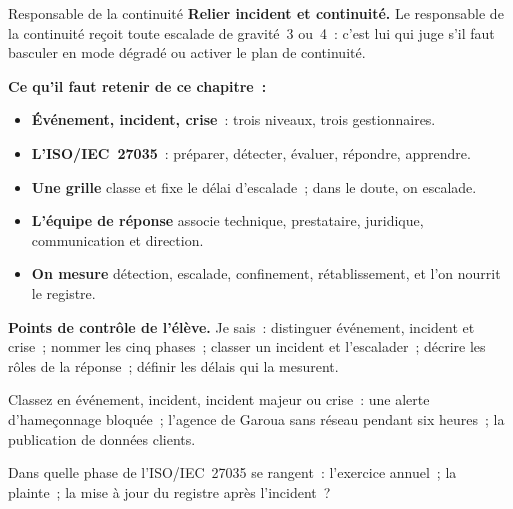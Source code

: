 \begin{boxmetier}{Responsable de la continuité}
\textbf{Relier incident et continuité.} Le responsable de la continuité
reçoit toute escalade de gravité~3 ou~4~: c'est lui qui juge s'il faut
basculer en mode dégradé ou activer le plan de continuité.
\end{boxmetier}

\separateur

\begin{boxresume}
\textbf{Ce qu'il faut retenir de ce chapitre~:}
\begin{itemize}
    \item \textbf{Événement, incident, crise}~: trois niveaux, trois
          gestionnaires.
    \item \textbf{L'ISO/IEC~27035}~: préparer, détecter, évaluer, répondre,
          apprendre.
    \item \textbf{Une grille} classe et fixe le délai d'escalade~; dans le
          doute, on escalade.
    \item \textbf{L'équipe de réponse} associe technique, prestataire,
          juridique, communication et direction.
    \item \textbf{On mesure} détection, escalade, confinement,
          rétablissement, et l'on nourrit le registre.
\end{itemize}
\end{boxresume}

\begin{boxinfo}
\textbf{Points de contrôle de l'élève.} Je sais~: distinguer événement,
incident et crise~; nommer les cinq phases~; classer un incident et
l'escalader~; décrire les rôles de la réponse~; définir les délais qui la
mesurent.
\end{boxinfo}

\bigskip

\begin{boxexo}[title={\ding{45}\quad Exercice~16.1. Quel niveau~? \niveaubase}]
Classez en événement, incident, incident majeur ou crise~: une alerte
d'hameçonnage bloquée~; l'agence de Garoua sans réseau pendant six
heures~; la publication de données clients.
\end{boxexo}

\begin{boxexo}[title={\ding{45}\quad Exercice~16.2. Les phases \niveaubase}]
Dans quelle phase de l'ISO/IEC~27035 se rangent~: l'exercice annuel~; la
plainte~; la mise à jour du registre après l'incident~?
\end{boxexo}

